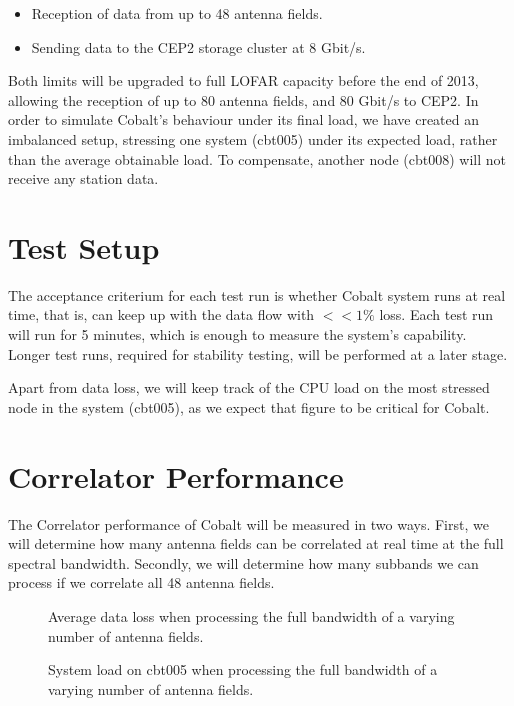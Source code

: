 \documentclass{report}
\begin{document}
\begin{itemize}
\item Reception of data from up to 48 antenna fields.
\item Sending data to the CEP2 storage cluster at 8 Gbit/s.
\end{itemize}

Both limits will be upgraded to full LOFAR capacity before the end of 2013, allowing the reception of up to 80 antenna fields, and 80 Gbit/s to CEP2. In order to simulate Cobalt's behaviour under its final load, we have created an imbalanced setup, stressing one system (cbt005) under its expected load, rather than the average obtainable load. To compensate, another node (cbt008) will not receive any station data.

\section {Test Setup}

The acceptance criterium for each test run is whether Cobalt system runs at real time, that is, can keep up with the data flow with $<<1\%$ loss. Each test run will run for 5 minutes, which is enough to measure the system's capability. Longer test runs, required for stability testing, will be performed at a later stage.

Apart from data loss, we will keep track of the CPU load on the most stressed node in the system (cbt005), as we expect that figure to be critical for Cobalt.

\section{Correlator Performance}

The Correlator performance of Cobalt will be measured in two ways. First, we will determine how many antenna fields can be correlated at real time at the full spectral bandwidth. Secondly, we will determine how many subbands we can process if we correlate all 48 antenna fields.

\begin{figure}
\centering
\caption{Average data loss when processing the full bandwidth of a varying number of antenna fields.}
\label{fig:corr_stations_loss}
\end{figure}

\begin{figure}
\centering
\caption{System load on cbt005 when processing the full bandwidth of a varying number of antenna fields.}
\label{fig:corr_stations_load}
\end{figure}
\end{document}
